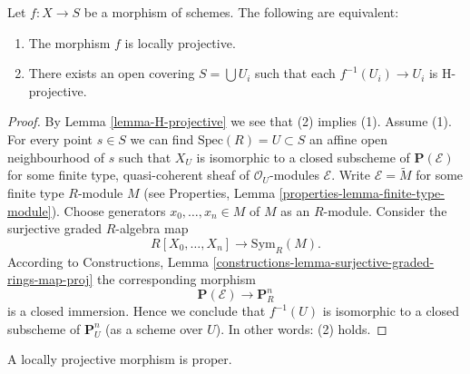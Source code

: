 \begin{lemma}
\label{lemma-characterize-locally-projective}
Let $f : X \to S$ be a morphism of schemes.
The following are equivalent:
\begin{enumerate}
\item The morphism $f$ is locally projective.
\item There exists an open covering $S = \bigcup U_i$ such
that each $f^{-1}(U_i) \to U_i$ is H-projective.
\end{enumerate}
\end{lemma}

\begin{proof}
By Lemma \ref{lemma-H-projective} we see that (2) implies (1). Assume (1).
For every point $s \in S$ we can find $\text{Spec}(R) = U \subset S$
an affine open neighbourhood of $s$ such that $X_U$ is isomorphic to a
closed subscheme of $\mathbf{P}(\mathcal{E})$ for some finite type,
quasi-coherent sheaf of $\mathcal{O}_U$-modules $\mathcal{E}$.
Write $\mathcal{E} = \widetilde{M}$ for some finite type
$R$-module $M$ (see
Properties, Lemma \ref{properties-lemma-finite-type-module}).
Choose generators $x_0, \ldots, x_n \in M$ of $M$ as an $R$-module.
Consider the surjective graded $R$-algebra map
$$
R[X_0, \ldots, X_n] \longrightarrow \text{Sym}_R(M).
$$
According to
Constructions, Lemma \ref{constructions-lemma-surjective-graded-rings-map-proj}
the corresponding morphism
$$
\mathbf{P}(\mathcal{E}) \to \mathbf{P}^n_R
$$
is a closed immersion. Hence we conclude that $f^{-1}(U)$ is isomorphic
to a closed subscheme of $\mathbf{P}^n_U$ (as a scheme over $U$).
In other words: (2) holds.
\end{proof}

\begin{lemma}
\label{lemma-locally-projective-proper}
A locally projective morphism is proper.
\end{lemma}

